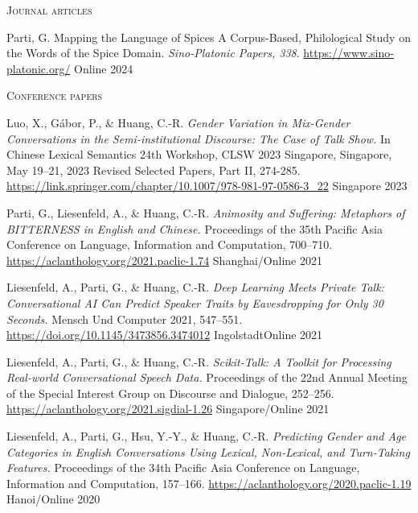 
\textsc{Journal articles}

\begin{cvhonors}

  \cvhonor
  {Parti, G.} %
  {Mapping the Language of Spices A Corpus-Based, Philological Study on the Words of the Spice Domain. \textit{Sino-Platonic Papers, 338}. \url{https://www.sino-platonic.org/}} %
  {Online} %
  {2024} %

\end{cvhonors}

\textsc{Conference papers}

\begin{cvhonors}

\cvhonor
{Luo, X., Gábor, P., \& Huang, C.-R.} %
{\textit{Gender Variation in Mix-Gender Conversations in the Semi-institutional Discourse: The Case of Talk Show.} In Chinese Lexical Semantics 24th Workshop, CLSW 2023
Singapore, Singapore, May 19–21, 2023 Revised Selected Papers, Part II, 274-285. \url{https://link.springer.com/chapter/10.1007/978-981-97-0586-3_22}} %
{Singapore} %
{2023} %

\cvhonor
{Parti, G., Liesenfeld, A., \& Huang, C.-R.} %
{\textit{Animosity and Suffering: Metaphors of BITTERNESS in English and Chinese.} Proceedings of the 35th Pacific Asia Conference on Language, Information and Computation, 700–710. \url{https://aclanthology.org/2021.paclic-1.74}} %
{Shanghai/Online} %
{2021} %

\cvhonor
{Liesenfeld, A., Parti, G., \& Huang, C.-R.} %
{\textit{Deep Learning Meets Private Talk: Conversational AI Can Predict Speaker Traits by Eavesdropping for Only 30 Seconds.} Mensch Und Computer 2021, 547–551. \url{https://doi.org/10.1145/3473856.3474012}} %
{IngolstadtOnline} %
{2021} %

\cvhonor
{Liesenfeld, A., Parti, G., \& Huang, C.-R.} %
{\textit{Scikit-Talk: A Toolkit for Processing Real-world Conversational Speech Data.} Proceedings of the 22nd Annual Meeting of the Special Interest Group on Discourse and Dialogue, 252–256. \url{https://aclanthology.org/2021.sigdial-1.26}} %
{Singapore/Online} %
{2021} %

\cvhonor
{Liesenfeld, A., Parti, G., Hsu, Y.-Y., \& Huang, C.-R.} %
{\textit{Predicting Gender and Age Categories in English Conversations Using Lexical, Non-Lexical, and Turn-Taking Features.} Proceedings of the 34th Pacific Asia Conference on Language, Information and Computation, 157–166. \url{https://aclanthology.org/2020.paclic-1.19}} %
{Hanoi/Online} %
{2020} %

\end{cvhonors}

